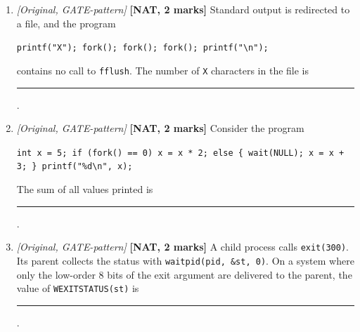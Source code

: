 \documentclass[11pt]{article}
\begin{document}
\begin{enumerate}
\item[\textbf{Q8}] \textit{[Original, GATE-pattern]} \textbf{[NAT, 2 marks]} Standard output is redirected to a file, and the program
\begin{center}\texttt{printf("X"); fork(); fork(); fork(); printf("\textbackslash n");}\end{center}
contains no call to \texttt{fflush}. The number of \texttt{X} characters in the file is \rule{1.5cm}{0.4pt}.

\item[\textbf{Q9}] \textit{[Original, GATE-pattern]} \textbf{[NAT, 2 marks]} Consider the program
\begin{center}\texttt{int x = 5; if (fork() == 0) x = x * 2; else \{ wait(NULL); x = x + 3; \} printf("\%d\textbackslash n", x);}\end{center}
The sum of all values printed is \rule{1.5cm}{0.4pt}.

\item[\textbf{Q10}] \textit{[Original, GATE-pattern]} \textbf{[NAT, 2 marks]} A child process calls \texttt{exit(300)}. Its parent collects the status with \texttt{waitpid(pid, \&st, 0)}. On a system where only the low-order 8 bits of the exit argument are delivered to the parent, the value of \texttt{WEXITSTATUS(st)} is \rule{1.5cm}{0.4pt}.

\end{enumerate}
\end{document}
